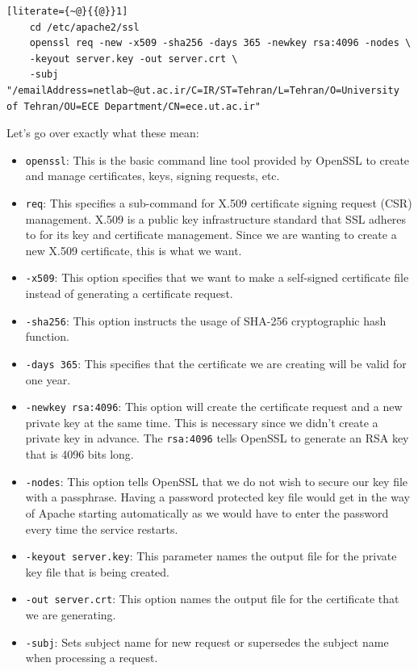 \documentclass{UTNetLab}
\newcommand{\lstsetterm}{\lstset{backgroundcolor=\color{red!10}}}
\begin{document}
        \lstsetterm
        \begin{lstlisting}[literate={~@}{{@}}1]
	cd /etc/apache2/ssl
	openssl req -new -x509 -sha256 -days 365 -newkey rsa:4096 -nodes \
	-keyout server.key -out server.crt \
	-subj "/emailAddress=netlab~@ut.ac.ir/C=IR/ST=Tehran/L=Tehran/O=University of Tehran/OU=ECE Department/CN=ece.ut.ac.ir"
        \end{lstlisting}

        Let's go over exactly what these mean:

        \begin{itemize}
            \item \lstinline{openssl}: This is the basic command line tool provided by OpenSSL to create and manage certificates, keys, signing requests, etc.
            \item \lstinline{req}: This specifies a sub-command for X.509 certificate signing request (CSR) management. X.509 is a public key infrastructure standard that SSL adheres to for its key and certificate management. Since we are wanting to create a new X.509 certificate, this is what we want.
            \item \lstinline{-x509}: This option specifies that we want to make a self-signed certificate file instead of generating a certificate request.
            \item \lstinline{-sha256}: This option instructs the usage of SHA-256 cryptographic hash function.
            \item \lstinline{-days 365}: This specifies that the certificate we are creating will be valid for one year.
            \item \lstinline{-newkey rsa:4096}: This option will create the certificate request and a new private key at the same time. This is necessary since we didn't create a private key in advance. The \lstinline{rsa:4096} tells OpenSSL to generate an RSA key that is 4096 bits long.
            \item \lstinline{-nodes}: This option tells OpenSSL that we do not wish to secure our key file with a passphrase. Having a password protected key file would get in the way of Apache starting automatically as we would have to enter the password every time the service restarts.
            \item \lstinline{-keyout server.key}: This parameter names the output file for the private key file that is being created.
            \item \lstinline{-out server.crt}: This option names the output file for the certificate that we are generating.
            \item \lstinline{-subj}: Sets subject name for new request or supersedes the subject name when processing a request.
        \end{itemize}
\end{document}
